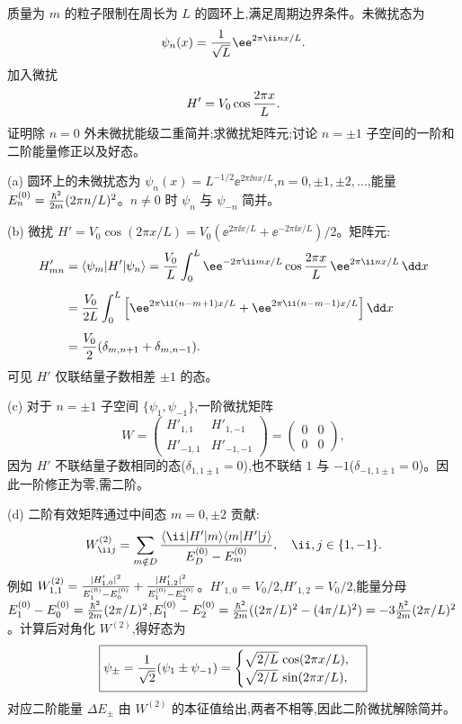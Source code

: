 \begin{question}
质量为 $m$ 的粒子限制在周长为 $L$ 的圆环上,满足周期边界条件。未微扰态为
\[
\psi_n(x)={1\over\sqrt L}\ee^{2\pi \ii n x/L}.
\]
加入微扰
\[
H'=V_0\cos{2\pi x\over L}.
\]
证明除 $n=0$ 外未微扰能级二重简并;求微扰矩阵元;讨论 $n=\pm1$ 子空间的一阶和二阶能量修正以及好态。
\begin{solution}
(a) 圆环上的未微扰态为 $\psi_n(x)=L^{-1/2}\ee^{2\pi \ii n x/L}$,$n=0,\pm1,\pm2,\dots$,能量 $E_n^{(0)}={\hbar^2\over2m}(2\pi n/L)^2$。$n\ne0$ 时 $\psi_n$ 与 $\psi_{-n}$ 简并。

(b) 微扰 $H'=V_0\cos(2\pi x/L)=V_0(\ee^{2\pi \ii x/L}+\ee^{-2\pi \ii x/L})/2$。矩阵元:
\[
\begin{aligned}
H'_{mn} &= \langle\psi_m|H'|\psi_n\rangle
= {V_0\over L}\int_0^L \ee^{-2\pi \ii mx/L}\cos{2\pi x\over L}\,\ee^{2\pi \ii nx/L}\,\dd x \\[4pt]
&= {V_0\over2L}\int_0^L \left[\ee^{2\pi \ii (n-m+1)x/L}+\ee^{2\pi \ii (n-m-1)x/L}\right]\dd x \\[4pt]
&= {V_0\over2}(\delta_{m,n+1}+\delta_{m,n-1}).
\end{aligned}
\]
可见 $H'$ 仅联结量子数相差 $\pm1$ 的态。

(c) 对于 $n=\pm1$ 子空间 $\{\psi_1,\psi_{-1}\}$,一阶微扰矩阵
\[
W = \begin{pmatrix}
H'_{1,1} & H'_{1,-1}\\
H'_{-1,1} & H'_{-1,-1}
\end{pmatrix}
= \begin{pmatrix}
0 & 0\\
0 & 0
\end{pmatrix},
\]
因为 $H'$ 不联结量子数相同的态($\delta_{1,1\pm1}=0$),也不联结 $1$ 与 $-1$($\delta_{-1,1\pm1}=0$)。因此一阶修正为零,需二阶。

(d) 二阶有效矩阵通过中间态 $m=0,\pm2$ 贡献:
\[
W^{(2)}_{\ii j} = \sum_{m\notin D} {\langle \ii|H'|m\rangle\langle m|H'|j\rangle\over E_D^{(0)}-E_m^{(0)}},\quad \ii,j\in\{1,-1\}.
\]
例如 $W^{(2)}_{1,1} = {|H'_{1,0}|^2\over E_1^{(0)}-E_0^{(0)}} + {|H'_{1,2}|^2\over E_1^{(0)}-E_2^{(0)}}$。$H'_{1,0}=V_0/2$,$H'_{1,2}=V_0/2$,能量分母 $E_1^{(0)}-E_0^{(0)}={\hbar^2\over2m}(2\pi/L)^2$,$E_1^{(0)}-E_2^{(0)}={\hbar^2\over2m}((2\pi/L)^2-(4\pi/L)^2)=-3{\hbar^2\over2m}(2\pi/L)^2$。计算后对角化 $W^{(2)}$,得好态为
\[
\boxed{\psi_\pm = {1\over\sqrt2}(\psi_1\pm\psi_{-1}) = \begin{cases}
\sqrt{2/L}\,\cos(2\pi x/L),\\
\sqrt{2/L}\,\sin(2\pi x/L),
\end{cases}}
\]
对应二阶能量 $\Delta E_\pm$ 由 $W^{(2)}$ 的本征值给出,两者不相等,因此二阶微扰解除简并。
\end{solution}
\end{question}

